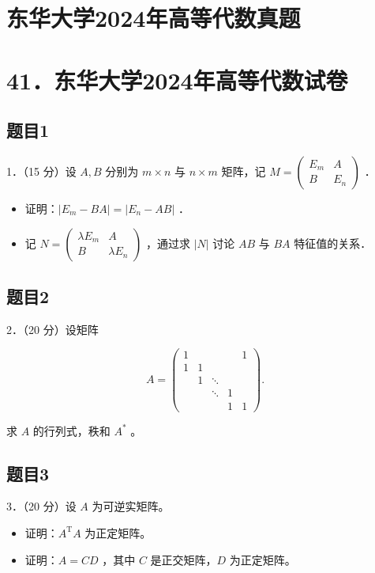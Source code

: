 \documentclass{article}
\begin{document}
\section*{东华大学2024年高等代数真题}
\section*{41．东华大学2024年高等代数试卷}

\subsection{题目1}
1．（15 分）设 \(A, B\) 分别为 \(m \times n\) 与 \(n \times m\) 矩阵，记 \(M=\left(\begin{array}{cc}E_{m} & A \\ B & E_{n}\end{array}\right)\) ．

\begin{itemize}
  \item[（1）] 证明：\(\left|E_{m}-B A\right|=\left|E_{n}-A B\right|\) ．
  \item[（2）] 记 \(N=\left(\begin{array}{cc}\lambda E_{m} & A \\ B & \lambda E_{n}\end{array}\right)\) ，通过求 \(|N|\) 讨论 \(A B\) 与 \(B A\) 特征值的关系．
\end{itemize}

\subsection{题目2}
2．（20 分）设矩阵

\[
A=\left(\begin{array}{lllll}
1 & & & & 1 \\
1 & 1 & & & \\
& 1 & \ddots & & \\
& & \ddots & 1 & \\
& & & 1 & 1
\end{array}\right) .
\]

求 \(A\) 的行列式，秩和 \(A^{*}\) 。

\subsection{题目3}
3．（20 分）设 \(A\) 为可逆实矩阵。

\begin{itemize}
  \item[（1）] 证明：\(A^{\mathrm{T}} A\) 为正定矩阵。
  \item[（2）] 证明：\(A=C D\) ，其中 \(C\) 是正交矩阵，\(D\) 为正定矩阵。
\end{itemize}
\end{document}
